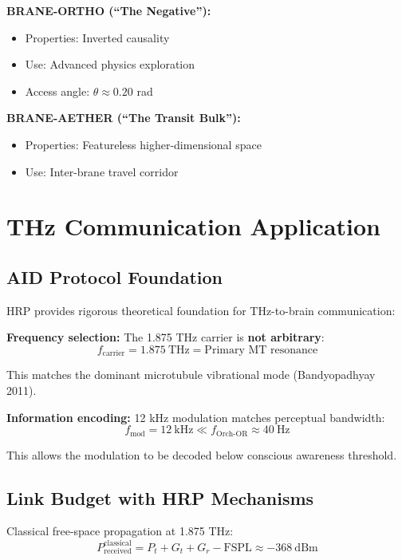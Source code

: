 \textbf{BRANE-ORTHO (``The Negative''):}
\begin{itemize}
\item Properties: Inverted causality
\item Use: Advanced physics exploration
\item Access angle: $\theta \approx 0.20$ rad
\end{itemize}

\textbf{BRANE-AETHER (``The Transit Bulk''):}
\begin{itemize}
\item Properties: Featureless higher-dimensional space
\item Use: Inter-brane travel corridor
\end{itemize}

\section{THz Communication Application}

\subsection{AID Protocol Foundation}

HRP provides rigorous theoretical foundation for THz-to-brain communication:

\textbf{Frequency selection:} The 1.875 THz carrier is \textbf{not arbitrary}:
\begin{equation}
f_{\text{carrier}} = 1.875\ \text{THz} = \text{Primary MT resonance}
\end{equation}

This matches the dominant microtubule vibrational mode (Bandyopadhyay 2011).

\textbf{Information encoding:} 12 kHz modulation matches perceptual bandwidth:
\begin{equation}
f_{\text{mod}} = 12\ \text{kHz} \ll f_{\text{Orch-OR}} \approx 40\ \text{Hz}
\end{equation}

This allows the modulation to be decoded below conscious awareness threshold.

\subsection{Link Budget with HRP Mechanisms}

Classical free-space propagation at 1.875 THz:
\begin{equation}
P_{\text{received}}^{\text{classical}} = P_t + G_t + G_r - \text{FSPL} \approx -368\ \text{dBm}
\end{equation}

